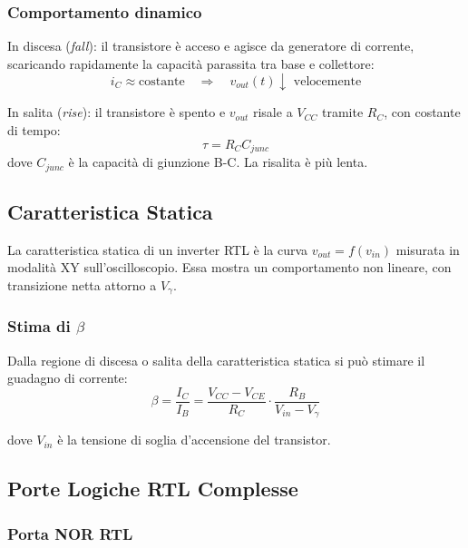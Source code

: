 \documentclass[a4paper,12pt]{article}
\begin{document}
\subsubsection*{Comportamento dinamico}

In discesa (\textit{fall}): il transistore è acceso e agisce da generatore di corrente, scaricando rapidamente la capacità parassita tra base e collettore:
\[
i_C \approx \text{costante} \quad \Rightarrow \quad v_{out}(t) \downarrow \text{ velocemente}
\]

In salita (\textit{rise}): il transistore è spento e \(v_{out}\) risale a \(V_{CC}\) tramite \(R_C\), con costante di tempo:
\begin{equation}
    \tau = R_C C_{junc}
\end{equation}
\noindent dove \(C_{junc}\) è la capacità di giunzione B-C. La risalita è più lenta.

\subsection{Caratteristica Statica}

La caratteristica statica di un inverter RTL è la curva \(v_{out} = f(v_{in})\) misurata in modalità XY sull’oscilloscopio. Essa mostra un comportamento non lineare, con transizione netta attorno a \(V_{\gamma}\).

\subsubsection*{Stima di \(\beta\)}

Dalla regione di discesa o salita della caratteristica statica si può stimare il guadagno di corrente:
\begin{equation}
  \beta = \frac{I_C}{I_B} = \frac{V_{CC} - V_{CE}}{R_C} \cdot \frac{R_B}{V_{in} - V_{\gamma}}
  \label{eq: guadagno}
\end{equation}

\noindent dove \(V_{in}\) è la tensione di soglia d’accensione del transistor.

\subsection{Porte Logiche RTL Complesse}

\subsubsection*{Porta NOR RTL}\label{verita}
\end{document}
